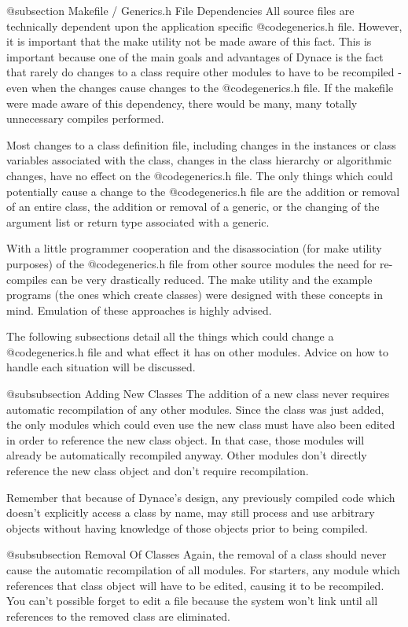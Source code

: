 @subsection Makefile / Generics.h File Dependencies
All source files are technically dependent upon the application specific
@code{generics.h} file.  However, it is important that the make utility
not be made aware of this fact.  This is important because one of the main
goals and advantages of Dynace is the fact that rarely do changes to a class
require other modules to have to be recompiled - even when the changes
cause changes to the @code{generics.h} file.  If the makefile were
made aware of this dependency, there would be many, many totally
unnecessary compiles performed.

Most changes to a class definition file, including changes in the
instances or class variables associated with the class, changes in the
class hierarchy or algorithmic changes, have no effect on the
@code{generics.h} file.  The only things which could potentially cause a
change to the @code{generics.h} file are the addition or removal of an
entire class, the addition or removal of a generic, or the changing of
the argument list or return type associated with a generic.

With a little programmer cooperation and the disassociation (for make
utility purposes) of the @code{generics.h} file from other source
modules the need for re-compiles can be very drastically reduced.  The
make utility and the example programs (the ones which create
classes) were designed with these concepts in mind.  Emulation of
these approaches is highly advised.

The following subsections detail all the things which could change
a @code{generics.h} file and what effect it has on other modules.
Advice on how to handle each situation will be discussed.

@subsubsection Adding New Classes
The addition of a new class never requires automatic recompilation
of any other modules.  Since the class was just added, the only modules
which could even use the new class must have also been edited in
order to reference the new class object.  In that case, those modules
will already be automatically recompiled anyway.  Other modules
don't directly reference the new class object and don't require
recompilation.

Remember that because of Dynace's design, any previously compiled code
which doesn't explicitly access a class by name, may still process
and use arbitrary objects without having knowledge of those objects
prior to being compiled.

@subsubsection Removal Of Classes
Again, the removal of a class should never cause the automatic
recompilation of all modules.  For starters, any module which
references that class object will have to be edited, causing it to
be recompiled.  You can't possible forget to edit a file because
the system won't link until all references to the removed class
are eliminated.

